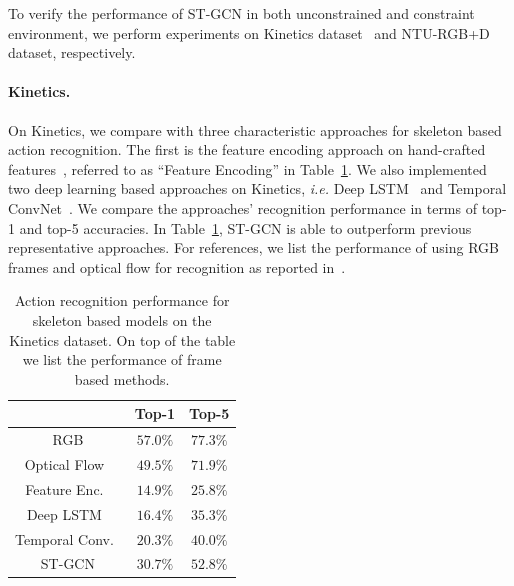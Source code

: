\documentclass[letterpaper]{article} %
\begin{document}
To verify the performance of ST-GCN in both unconstrained and constraint environment, we perform experiments on Kinetics dataset~\cite{Kay2017Kinetics} and NTU-RGB+D dataset\cite{Shahroudy2016CVPR}, respectively.

\paragraph{Kinetics.}
On Kinetics, we compare with three characteristic approaches for skeleton based action recognition. The first is the feature encoding approach on hand-crafted features~\cite{Fernando2015VideoDarwin}, referred to as ``Feature Encoding'' in Table~\ref{tab:kinetics}. 
We also implemented two deep learning based approaches on Kinetics, \emph{i.e.} Deep LSTM~\cite{Shahroudy2016CVPR} and Temporal ConvNet~\cite{Kim2017CVPRW}.
We compare the approaches' recognition performance in terms of top-1 and top-5 accuracies.
In Table~\ref{tab:kinetics}, ST-GCN is able to outperform previous representative approaches. 
For references, we list the performance of using RGB frames and optical flow for recognition as reported in~\cite{Kay2017Kinetics}.

\begin{table}
	\centering
	\begin{tabular}{c|c|c}
		\hline
		& Top-1 & Top-5 \\ \hline
		RGB\cite{Kay2017Kinetics}				& 	$57.0\%$ &$77.3\%$\\
		Optical Flow~\cite{Kay2017Kinetics}	& 	$49.5\%$ &$71.9\%$ \\\hline
		Feature Enc.~\cite{Fernando2015VideoDarwin}	& $14.9\%$	& $25.8\%$\\
		Deep LSTM~\cite{Shahroudy2016CVPR}		& $16.4\%$	&$35.3\%$  \\
		Temporal Conv.~\cite{Kim2017CVPRW}	& $20.3\%$& $40.0\%$ \\\hline
		ST-GCN 					&  $\mathbf{30.7\%}$& $\mathbf{52.8\%}$ \\\hline
	\end{tabular}
	\caption{Action recognition performance for skeleton based models on the Kinetics dataset.  On top of the table we list the performance of frame based methods. }\label{tab:kinetics}
\end{table}
\end{document}
